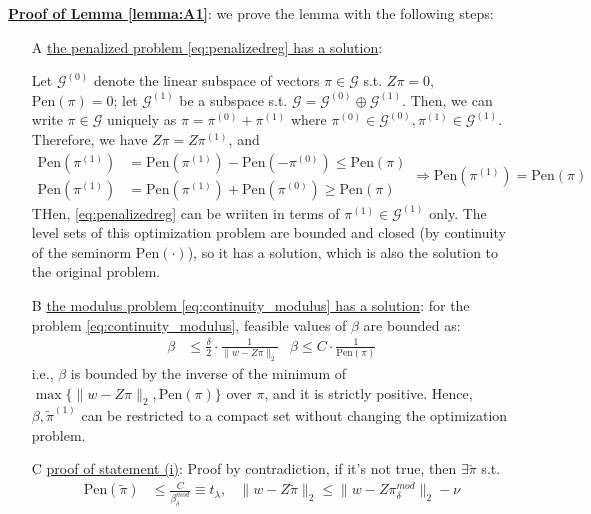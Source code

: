 \documentclass{article}
\begin{document}
\underline{\textbf{Proof of Lemma \ref{lemma:A1}}}: we prove the lemma with the following steps:
\begin{itemize}
  \item[A] \underline{the penalized problem \ref{eq:penalizedreg} has a solution}: 
  
  Let $\mathcal{G}^{(0)}$ denote the linear subspace of vectors $\pi \in \mathcal{G}$ s.t. $Z\pi=0$, $\mathrm{Pen}(\pi)=0$; let $\mathcal{G}^{(1)}$ be a subspace s.t. $\mathcal{G}=\mathcal{G}^{(0)} \oplus \mathcal{G}^{(1)}$. Then, we can write $\pi \in \mathcal{G}$ uniquely as $\pi = \pi^{(0)}+\pi^{(1)}$ where $\pi^{(0)} \in\mathcal{G}^{(0)},\pi^{(1)}\in\mathcal{G}^{(1)}$. Therefore, we have $Z\pi = Z\pi^{(1)}$, and 
  $$
  \begin{aligned}
    \mathrm{Pen}(\pi^{(1)}) &= \mathrm{Pen}(\pi^{(1)}) - \mathrm{Pen}(-\pi^{(0)}) \leq \mathrm{Pen}(\pi)\\
      \mathrm{Pen}(\pi^{(1)}) &= \mathrm{Pen}(\pi^{(1)}) + \mathrm{Pen}(\pi^{(0)}) \geq \mathrm{Pen}(\pi)
  \end{aligned} \Rightarrow \mathrm{Pen}(\pi^{(1)}) = \mathrm{Pen}(\pi)
  $$
  THen, \ref{eq:penalizedreg} can be wriiten in terms of $\pi^{(1)}\in\mathcal{G}^{(1)}$ only. The level sets of this optimization problem are bounded and closed (by continuity of the seminorm $\mathrm{Pen}(\cdot)$), so it has a solution, which is also the solution to the original problem.
  \item[B] \underline{the modulus problem \ref{eq:continuity_modulus} has a solution}: for the problem \ref{eq:continuity_modulus}, feasible values of $\beta$ are bounded as:
  \begin{align*}
    \beta &\leq \frac{\delta}{2}\cdot \frac{1}{\lVert w-Z\pi \rVert_2} & \beta \leq C \cdot\frac{1}{\mathrm{Pen}(\pi)}
  \end{align*}
  i.e., $\beta$ is bounded by the inverse of the minimum of $\max \{ \lVert w-Z\pi \rVert_2,\mathrm{Pen}(\pi) \}$ over $\pi$, and it is strictly positive. Hence, $\beta,\tilde{\pi}^{(1)}$ can be restricted to a compact set without changing the optimization problem.
  \item[C] \underline{proof of statement (i)}: Proof by contradiction, if it's not true, then $\exists \tilde{\pi}$ s.t.
  \begin{align*}
    \mathrm{Pen}(\tilde{\pi})&\leq \frac{C}{\beta_{\delta}^{mod}}\equiv t_{\lambda}, & \lVert w-Z\tilde{\pi} \rVert_2 \leq \lVert w-Z \pi_{\delta}^{mod} \rVert_2 - \nu
  \end{align*}

\end{itemize}
\end{document}
